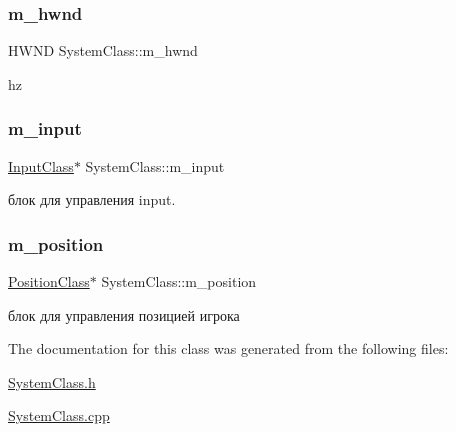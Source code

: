 \subsubsection{\texorpdfstring{m\+\_\+hwnd}{m\_hwnd}}
{\footnotesize\ttfamily H\+W\+ND System\+Class\+::m\+\_\+hwnd\hspace{0.3cm}{\ttfamily [private]}}



hz 

\mbox{\label{class_system_class_a59754aa6c2f1183a069961b2999da210}} 
\subsubsection{\texorpdfstring{m\+\_\+input}{m\_input}}
{\footnotesize\ttfamily \hyperlink{class_input_class}{Input\+Class}$\ast$ System\+Class\+::m\+\_\+input\hspace{0.3cm}{\ttfamily [private]}}



блок для управления input. 

\mbox{\label{class_system_class_a50f3aa02021aa6813bc2e30dfcb8d8ae}} 
\subsubsection{\texorpdfstring{m\+\_\+position}{m\_position}}
{\footnotesize\ttfamily \hyperlink{class_position_class}{Position\+Class}$\ast$ System\+Class\+::m\+\_\+position\hspace{0.3cm}{\ttfamily [private]}}



блок для управления позицией игрока 



The documentation for this class was generated from the following files\+:\begin{DoxyCompactItemize}
\item 
\hyperlink{_system_class_8h}{System\+Class.\+h}\item 
\hyperlink{_system_class_8cpp}{System\+Class.\+cpp}\end{DoxyCompactItemize}
